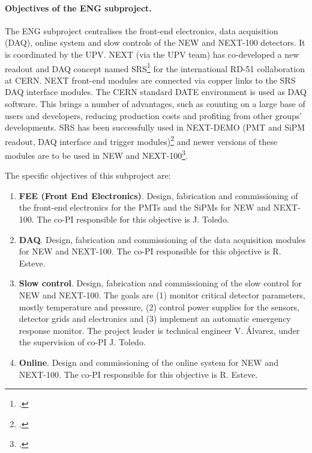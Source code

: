 \paragraph{Objectives of the ENG subproject.}

The ENG subproject centralises the front-end electronics, data acquisition (DAQ), online system and slow controls of the NEW and NEXT-100 detectors. It is coordinated by the UPV. NEXT (via the UPV team) has co-developed a new readout and DAQ concept named SRS\footcite{Toledo2011,SRS2013} for the international RD-51 collaboration at CERN. NEXT front-end modules are connected via copper links to the SRS DAQ interface modules. The CERN standard DATE environment is used as DAQ software. This brings a number of advantages, such as counting on a large base of users and developers, reducing production costs and profiting from other groups' developments. SRS has been successfully used in NEXT-DEMO (PMT and SiPM readout, DAQ interface and trigger modules)\footcite{Gil2012,Herrero2012,Esteve2012} and newer versions of these modules are to be used in NEW and NEXT-100\footcite{TWEPP2014}.

The specific objectives of this subproject are:

\begin{enumerate}

\item {\bf FEE (Front End Electronics)}. Design, fabrication and commissioning of the front-end electronics for the PMTs and the SiPMs for NEW and NEXT-100. The co-PI responsible for this objective is J. Toledo.
 
\item {\bf DAQ}. Design, fabrication and commissioning of the data acquisition modules for NEW and NEXT-100. The co-PI responsible for this objective is R. Esteve. 

\item {\bf Slow control}. Design, fabrication and commissioning of the slow control for NEW and NEXT-100. The goals are (1) monitor critical detector parameters, mostly temperature and pressure, (2) control power supplies for the sensors, detector grids and electronics and (3) implement an automatic emergency response monitor. The project leader is technical engineer V. Álvarez, under the supervision of co-PI J. Toledo.

\item {\bf Online}. Design and commissioning of the online system for NEW and NEXT-100. The co-PI responsible for this objective is R. Esteve.

\end{enumerate}